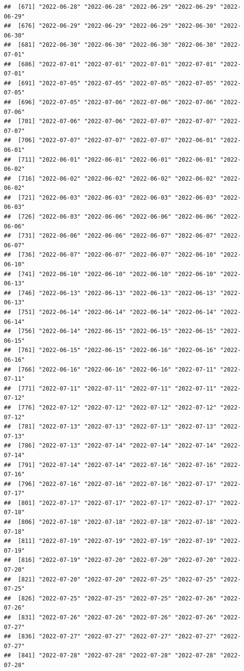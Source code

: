 \documentclass[
]{article}
\begin{document}
\begin{verbatim}
##  [671] "2022-06-28" "2022-06-28" "2022-06-29" "2022-06-29" "2022-06-29"
##  [676] "2022-06-29" "2022-06-29" "2022-06-29" "2022-06-30" "2022-06-30"
##  [681] "2022-06-30" "2022-06-30" "2022-06-30" "2022-06-30" "2022-07-01"
##  [686] "2022-07-01" "2022-07-01" "2022-07-01" "2022-07-01" "2022-07-01"
##  [691] "2022-07-05" "2022-07-05" "2022-07-05" "2022-07-05" "2022-07-05"
##  [696] "2022-07-05" "2022-07-06" "2022-07-06" "2022-07-06" "2022-07-06"
##  [701] "2022-07-06" "2022-07-06" "2022-07-07" "2022-07-07" "2022-07-07"
##  [706] "2022-07-07" "2022-07-07" "2022-07-07" "2022-06-01" "2022-06-01"
##  [711] "2022-06-01" "2022-06-01" "2022-06-01" "2022-06-01" "2022-06-02"
##  [716] "2022-06-02" "2022-06-02" "2022-06-02" "2022-06-02" "2022-06-02"
##  [721] "2022-06-03" "2022-06-03" "2022-06-03" "2022-06-03" "2022-06-03"
##  [726] "2022-06-03" "2022-06-06" "2022-06-06" "2022-06-06" "2022-06-06"
##  [731] "2022-06-06" "2022-06-06" "2022-06-07" "2022-06-07" "2022-06-07"
##  [736] "2022-06-07" "2022-06-07" "2022-06-07" "2022-06-10" "2022-06-10"
##  [741] "2022-06-10" "2022-06-10" "2022-06-10" "2022-06-10" "2022-06-13"
##  [746] "2022-06-13" "2022-06-13" "2022-06-13" "2022-06-13" "2022-06-13"
##  [751] "2022-06-14" "2022-06-14" "2022-06-14" "2022-06-14" "2022-06-14"
##  [756] "2022-06-14" "2022-06-15" "2022-06-15" "2022-06-15" "2022-06-15"
##  [761] "2022-06-15" "2022-06-15" "2022-06-16" "2022-06-16" "2022-06-16"
##  [766] "2022-06-16" "2022-06-16" "2022-06-16" "2022-07-11" "2022-07-11"
##  [771] "2022-07-11" "2022-07-11" "2022-07-11" "2022-07-11" "2022-07-12"
##  [776] "2022-07-12" "2022-07-12" "2022-07-12" "2022-07-12" "2022-07-12"
##  [781] "2022-07-13" "2022-07-13" "2022-07-13" "2022-07-13" "2022-07-13"
##  [786] "2022-07-13" "2022-07-14" "2022-07-14" "2022-07-14" "2022-07-14"
##  [791] "2022-07-14" "2022-07-14" "2022-07-16" "2022-07-16" "2022-07-16"
##  [796] "2022-07-16" "2022-07-16" "2022-07-16" "2022-07-17" "2022-07-17"
##  [801] "2022-07-17" "2022-07-17" "2022-07-17" "2022-07-17" "2022-07-18"
##  [806] "2022-07-18" "2022-07-18" "2022-07-18" "2022-07-18" "2022-07-18"
##  [811] "2022-07-19" "2022-07-19" "2022-07-19" "2022-07-19" "2022-07-19"
##  [816] "2022-07-19" "2022-07-20" "2022-07-20" "2022-07-20" "2022-07-20"
##  [821] "2022-07-20" "2022-07-20" "2022-07-25" "2022-07-25" "2022-07-25"
##  [826] "2022-07-25" "2022-07-25" "2022-07-25" "2022-07-26" "2022-07-26"
##  [831] "2022-07-26" "2022-07-26" "2022-07-26" "2022-07-26" "2022-07-27"
##  [836] "2022-07-27" "2022-07-27" "2022-07-27" "2022-07-27" "2022-07-27"
##  [841] "2022-07-28" "2022-07-28" "2022-07-28" "2022-07-28" "2022-07-28"

\end{verbatim}
\end{document}

